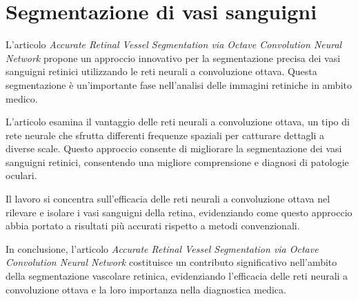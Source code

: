 \section{Segmentazione di vasi sanguigni}
\label{sec:segmentazione_vasi_sanguigni}

L'articolo \textit{Accurate Retinal Vessel Segmentation via Octave Convolution
Neural Network} \cite{fan2020accurate} propone un approccio innovativo per la
segmentazione precisa dei vasi sanguigni retinici utilizzando le reti neurali a
convoluzione ottava. Questa segmentazione è un'importante fase nell'analisi
delle immagini retiniche in ambito medico.

L'articolo esamina il vantaggio delle reti neurali a convoluzione ottava, un
tipo di rete neurale che sfrutta differenti frequenze spaziali per catturare
dettagli a diverse scale. Questo approccio consente di migliorare la
segmentazione dei vasi sanguigni retinici, consentendo una migliore
comprensione e diagnosi di patologie oculari.

Il lavoro si concentra sull'efficacia delle reti neurali a convoluzione ottava
nel rilevare e isolare i vasi sanguigni della retina, evidenziando come questo
approccio abbia portato a risultati più accurati rispetto a metodi
convenzionali.

In conclusione, l'articolo \textit{Accurate Retinal Vessel Segmentation via
Octave Convolution Neural Network} costituisce un contributo significativo
nell'ambito della segmentazione vascolare retinica, evidenziando l'efficacia
delle reti neurali a convoluzione ottava e la loro importanza nella diagnostica
medica.

